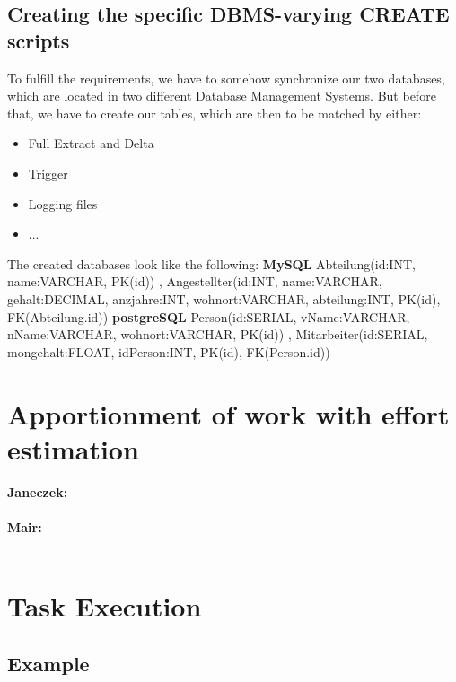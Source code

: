 \documentclass[11pt,a4paper]{article}
\begin{document}
\subsection{Creating the specific DBMS-varying CREATE scripts}
To fulfill the requirements, we have to somehow synchronize our two databases, which are located in two different Database Management Systems. But before that, we have to create our tables, which are then to be matched by either:
\begin{itemize}
	\item Full Extract and Delta
	\item Trigger
	\item Logging files
	\item ...
\end{itemize}
\noindent The created databases look like the following: \newline \newline
\textbf{MySQL} Abteilung(id:INT, name:VARCHAR, PK(id)) , Angestellter(id:INT, name:VARCHAR, gehalt:DECIMAL, anzjahre:INT, wohnort:VARCHAR, abteilung:INT, PK(id), FK(Abteilung.id)) \newline \newline
\textbf{postgreSQL} Person(id:SERIAL, vName:VARCHAR, nName:VARCHAR, wohnort:VARCHAR, PK(id)) , Mitarbeiter(id:SERIAL, mongehalt:FLOAT, idPerson:INT, PK(id), FK(Person.id))

\newpage
\section{Apportionment of work with effort estimation}

\textbf{Janeczek:} \\ \\
\textbf{Mair:} \\ \\

\newpage
\section{Task Execution}
\subsection{Example}

\newpage
\end{document}
